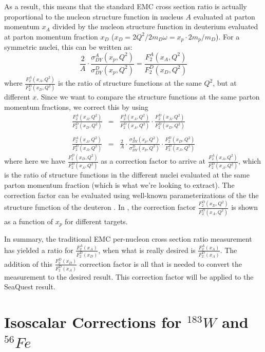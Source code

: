 As a result, this means that the standard EMC cross section ratio is actually proportional to the nucleon structure function in nucleus $A$ evaluated at parton momentum $x_A$ divided by the nucleon structure function in deuterium evaluated at parton momentum fraction $x_D$ ($x_D = 2Q^2/2m_D\omega = x_p \cdot 2m_p/m_D$)\cite{Hen:2013oha}. For a symmetric nuclei, this can be written as:
\begin{equation}
\frac{2}{A} \cdot \frac{\sigma^A_{DY}(x_p, Q^2)}{\sigma^D_{DY}(x_p, Q^2)} = \frac{F_2^A(x_A, Q^2)}{F_2^D(x_D, Q^2)}
\end{equation}
where $\frac{F_2^A(x_A, Q^2)}{F_2^D(x_D, Q^2)}$ is the ratio of structure functions at the same $Q^2$, but at different $x$. Since we want to compare the structure functions at the same parton momentum fractions, we correct this by using
\begin{eqnarray}
\frac{F_2^A(x_A, Q^2)}{F_2^D(x_D, Q^2)} & = & \frac{F_2^A(x_A, Q^2)}{F_2^D(x_A, Q^2)} \cdot \frac{F_2^D(x_A, Q^2)}{F_2^D(x_D, Q^2)} \\
& & \nonumber \\
\frac{F_2^A(x_A, Q^2)}{F_2^D(x_A, Q^2)} & = & \frac{2}{A} \cdot \frac{\sigma^A_{DY}(x_p, Q^2)}{\sigma^D_{DY}(x_p, Q^2)} \cdot \frac{F_2^D(x_D, Q^2)}{F_2^D(x_A, Q^2)}
\label{eq:struc-func-ratio-xA}
\end{eqnarray}
where here we have $\frac{F_2^D(x_D, Q^2)}{F_2^D(x_A, Q^2)}$ as a correction factor to arrive at $\frac{F_2^A(x_A, Q^2)}{F_2^D(x_A, Q^2)}$, which is the ratio of structure functions in the different nuclei evaluated at the same parton momentum fraction (which is what we're looking to extract). The correction factor can be evaluated using well-known parameterizations of the the structure function of the deuteron . In , the correction factor $\frac{F_2^D(x_D, Q^2)}{F_2^D(x_A, Q^2)}$ is shown as a function of $x_p$ for different targets.

In summary, the traditional EMC per-nucleon cross section ratio measurement has yielded a ratio for $\frac{F_2^A(x_A)}{F_2^D(x_D)}$, when what is really desired is $\frac{F_2^A(x_A)}{F_2^D(x_A)}$. The addition of this $\frac{F_2^D(x_D)}{F_2^D(x_A)}$ correction factor is all that is needed to convert the measurement to the desired result. This correction factor will be applied to the SeaQuest result.

\section{\texorpdfstring{Isoscalar Corrections for $^{183}W$ and $^{56}Fe$}{Isoscalar Corrections for W-183 and Fe-56 }}

